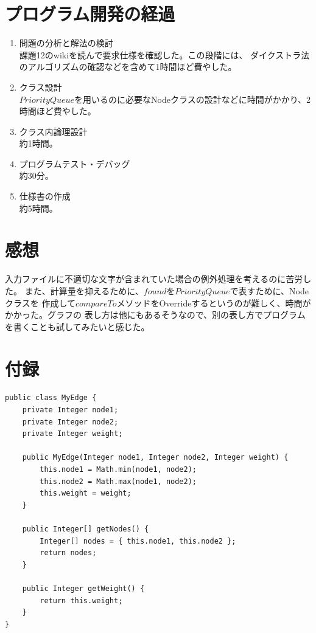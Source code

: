 \documentclass[a4j]{jarticle}
\begin{document}
\section{プログラム開発の経過}

\begin{enumerate}
  \item 問題の分析と解法の検討\\
  課題12のwikiを読んで要求仕様を確認した。この段階には、
  ダイクストラ法のアルゴリズムの確認などを含めて1時間ほど費やした。
  \item クラス設計\\
  \(PriorityQueue\)を用いるのに必要なNodeクラスの設計などに時間がかかり、2時間ほど費やした。
  \item クラス内論理設計\\
  約1時間。
  \item プログラムテスト・デバッグ\\
  約30分。
  \item 仕様書の作成\\
  約5時間。
\end{enumerate}

\section{感想}

入力ファイルに不適切な文字が含まれていた場合の例外処理を考えるのに苦労した。
また、計算量を抑えるために、\(found\)を\(PriorityQueue\)で表すために、Nodeクラスを
作成して\(compareTo\)メソッドをOverrideするというのが難しく、時間がかかった。グラフの
表し方は他にもあるそうなので、別の表し方でプログラムを書くことも試してみたいと感じた。

\newpage
\section*{付録}

\begin{lstlisting}[caption=MyEdge.java]
public class MyEdge {
    private Integer node1;
    private Integer node2;
    private Integer weight;

    public MyEdge(Integer node1, Integer node2, Integer weight) {
        this.node1 = Math.min(node1, node2);
        this.node2 = Math.max(node1, node2);
        this.weight = weight;
    }

    public Integer[] getNodes() {
        Integer[] nodes = { this.node1, this.node2 };
        return nodes;
    }

    public Integer getWeight() {
        return this.weight;
    }
}

\end{lstlisting}
\end{document}
